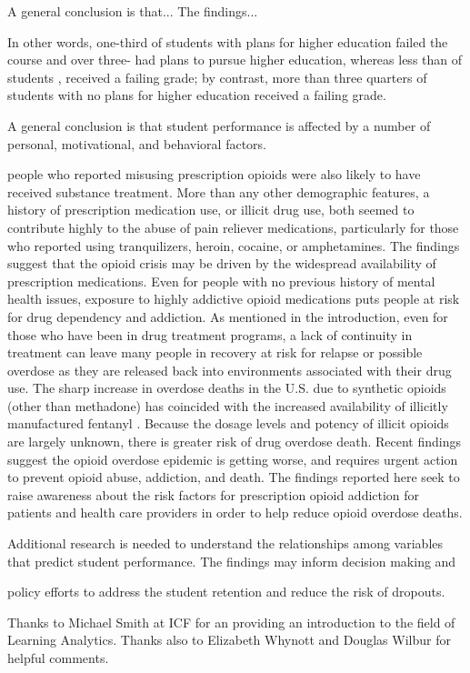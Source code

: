 \documentclass[sigconf]{acmart}
\begin{document}
A general conclusion is that... 
The findings...

In other words, 
one-third of students with plans for higher education failed the course and
over three-
had plans to pursue higher education, whereas less than  of students ,  received a failing grade; by contrast, more than three quarters of students with no plans for higher education received a 
failing grade. 

A general conclusion is that student performance is affected by a number of
personal, motivational, and behavioral factors. 


people who reported misusing prescription opioids 
were also likely to have received substance treatment. More than any other 
demographic features, a history of prescription medication use, or illicit drug 
use, both seemed to contribute highly to the abuse of pain reliever medications, 
particularly for those who reported using tranquilizers, heroin, cocaine, or 
amphetamines. The findings suggest that the opioid crisis may be driven by the 
widespread availability of prescription medications. Even for people with no 
previous history of mental health issues, exposure to highly addictive opioid 
medications puts people at risk for drug dependency and addiction. As mentioned 
in the introduction, even for those who have been in drug treatment programs, 
a lack of continuity in treatment can leave many people in recovery at risk 
for relapse or possible overdose as they are released back into environments 
associated with their drug use. The sharp increase in overdose deaths in the 
U.S. due to synthetic opioids (other than methadone) has coincided with the 
increased availability of illicitly manufactured fentanyl \cite{nida17}. 
Because the dosage levels and potency of illicit opioids are largely unknown, 
there is greater risk of drug overdose death. Recent findings suggest the 
opioid overdose epidemic is getting worse, and requires urgent action to prevent 
opioid abuse, addiction, and death. The findings reported here seek to raise 
awareness about the risk factors for prescription opioid addiction for patients 
and health care providers in order to help reduce opioid overdose deaths. 

Additional research is needed to understand the relationships among variables 
that predict student performance. The findings may inform decision making and 

policy efforts to address the student retention and reduce the risk of dropouts. 


\begin{acks}

Thanks to Michael Smith at ICF for an providing an introduction to the field
of Learning Analytics. Thanks also to Elizabeth Whynott and Douglas Wilbur 
for helpful comments. 

\end{acks}


 
\end{document}
